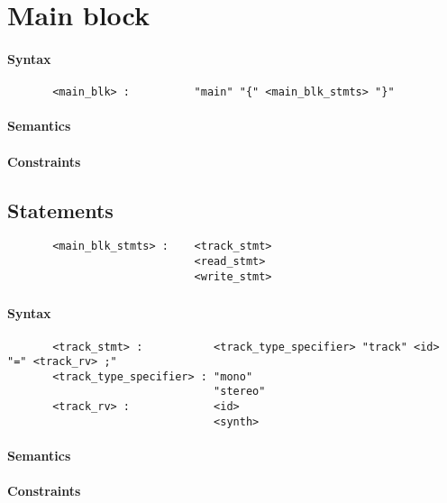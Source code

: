 \section{Main block}
\paragraph{Syntax}

\begin{verbatim}
       <main_blk> :          "main" "{" <main_blk_stmts> "}"
\end{verbatim}

\paragraph{Semantics}
\paragraph{Constraints}

\subsection{Statements }
\begin{verbatim}
       <main_blk_stmts> :    <track_stmt>
                             <read_stmt> 
                             <write_stmt> 
\end{verbatim}
\subsubsection{ }
\paragraph{Syntax}
\begin{verbatim}
       <track_stmt> :           <track_type_specifier> "track" <id> "=" <track_rv> ;"
       <track_type_specifier> : "mono"
                                "stereo"
       <track_rv> :             <id>
                                <synth>
\end{verbatim}
\paragraph{Semantics}
\paragraph{Constraints}
\subsubsection{ }
\subsubsection{ }


